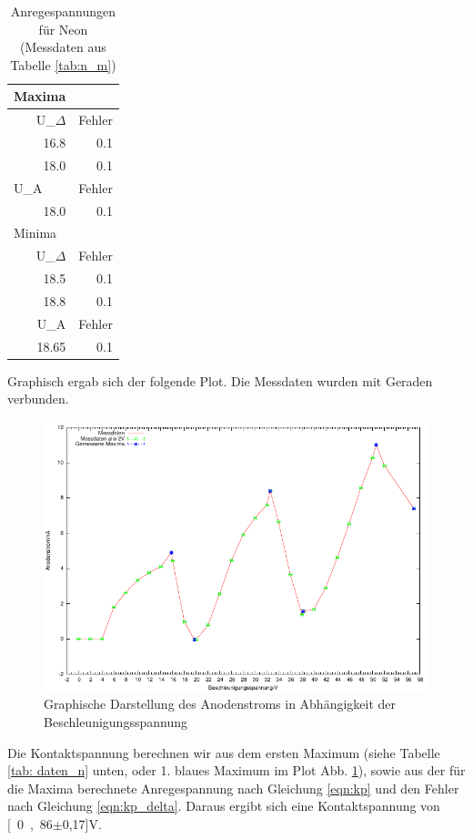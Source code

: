 \documentclass[12pt,a4paper]{article}
\begin{document}
\begin{table}[H]
\caption{Anregespannungen für Neon (Messdaten aus Tabelle \ref{tab:n_m})}
\begin{center}
\begin{tabular}{|r|r|}
\hline
\multicolumn{1}{|l|}{Maxima} & \multicolumn{1}{l|}{} \\ \hline
U\_$\Delta$ & Fehler \\ \hline
16.8 & 0.1 \\ \hline
18.0 & 0.1 \\ \hline
\multicolumn{1}{|l|}{U\_A} & \multicolumn{1}{l|}{Fehler} \\ \hline
18.0 & 0.1 \\ \hline
\multicolumn{1}{|l|}{Minima} & \multicolumn{1}{l|}{} \\ \hline
U\_$\Delta$ & Fehler \\ \hline
18.5 & 0.1 \\ \hline
18.8 & 0.1 \\ \hline
U\_A & Fehler \\ \hline
18.65 & 0.1 \\ \hline
\end{tabular}
\end{center}
\label{tab: auswertung_n}
\end{table}

Graphisch ergab sich der folgende Plot. Die Messdaten wurden mit Geraden verbunden.

\begin{figure}[H]
	\centering
	\includegraphics[scale= 1.5]{n_m.pdf}
	\caption{Graphische Darstellung des Anodenstroms in Abhängigkeit der Beschleunigungsspannung}
	\label{fig:plot_n}
\end{figure}
Die Kontaktspannung berechnen wir aus dem ersten Maximum (siehe Tabelle \ref{tab: daten_n} unten, oder 1. blaues Maximum im Plot Abb. \ref{fig:plot_n}), sowie aus der für die Maxima berechnete Anregespannung nach Gleichung \ref{eqn:kp} und den Fehler nach Gleichung \ref{eqn:kp_delta}.
Daraus ergibt sich eine Kontaktspannung von \unit[0,86$\pm$0,17]{V}.
\end{document}
